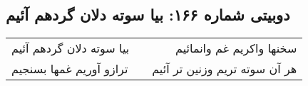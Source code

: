 \begin{center}
\section*{دوبیتی شماره ۱۶۶: بیا سوته دلان گردهم آئیم}
\label{sec:166}
\begin{longtable}{l p{0.5cm} r}
بیا سوته دلان گردهم آئیم
&&
سخنها واکریم غم وانمائیم
\\
ترازو آوریم غمها بسنجیم
&&
هر آن سوته تریم وزنین تر آئیم
\\
\end{longtable}
\end{center}
